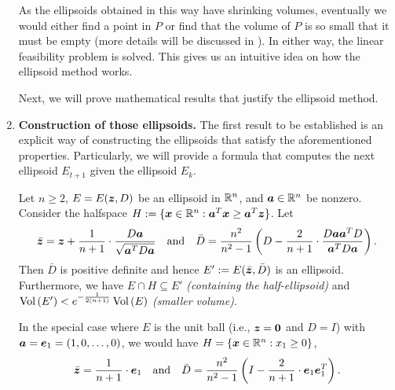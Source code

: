 \begin{enumerate}
\begin{enumerate}
\begin{center}
\end{center}
\end{enumerate}
As the ellipsoids obtained in this way have shrinking volumes, eventually we
would either find a point in \(P\) or find that the volume of \(P\) is so small
that it must be empty (more details will be discussed in
). In either way, the linear feasibility
problem is solved. This gives us an intuitive idea on how the ellipsoid method
works.

Next, we will prove mathematical results that justify the ellipsoid method.
\item \textbf{Construction of those ellipsoids.} The first result to be
established is an explicit way of constructing the ellipsoids that satisfy the
aforementioned properties. Particularly, we will provide a formula that computes
the next ellipsoid \(E_{t+1}\) given the ellipsoid \(E_{k}\).

\begin{theorem}
\label{thm:next-ellipsoid-fmla}
Let \(n\ge 2\), \(E=E(\bm{z},D)\) be an ellipsoid in \(\mathbb{R}^n\), and
\(\bm{a}\in\mathbb{R}^n\) be nonzero. Consider the halfspace
\(H:=\{\bm{x}\in\mathbb{R}^n:\bm{a}^{T}\bm{x}\ge\bm{a}^{T}\bm{z}\}\). Let
\[
\bar{\bm{z}}=\bm{z}+\frac{1}{n+1}\cdot \frac{D\bm{a}}{\sqrt{\bm{a}^{T}D\bm{a}}}
\quad\text{and}\quad
\bar{D}=\frac{n^{2}}{n^{2}-1}\left(D-\frac{2}{n+1}\cdot 
\frac{D\bm{a}\bm{a}^{T}D}{\bm{a}^{T}D\bm{a}}\right).
\]
Then \(\bar{D}\) is positive definite and hence
\(E':=E(\bar{\bm{z}},\bar{D})\) is an ellipsoid. Furthermore, we have \(E\cap
H\subseteq E'\) \emph{(containing the half-ellipsoid)} and
\(\operatorname{Vol}\left(E'\right)<e^{-\frac{1}{2(n+1)}}\operatorname{Vol}\left(E\right)\) \emph{(smaller volume)}.
\end{theorem}
\begin{note}
In the special case where \(E\) is the unit ball (i.e.,
\(\bm{z}=\bm{0}\) and \(D=I\)) with
\(\bm{a}=\bm{e}_1=(1,0,\dotsc,0)\), we would have
\(H=\{\bm{x}\in\mathbb{R}^n:x_1\ge 0\}\),
\[
\bar{\bm{z}}=\frac{1}{n+1}\cdot \bm{e}_1
\quad\text{and}\quad
\bar{D}=\frac{n^{2}}{n^{2}-1}\left(I-\frac{2}{n+1}\cdot \bm{e}_1\bm{e}_1^{T}\right).
\]
\end{note}


\end{enumerate}
